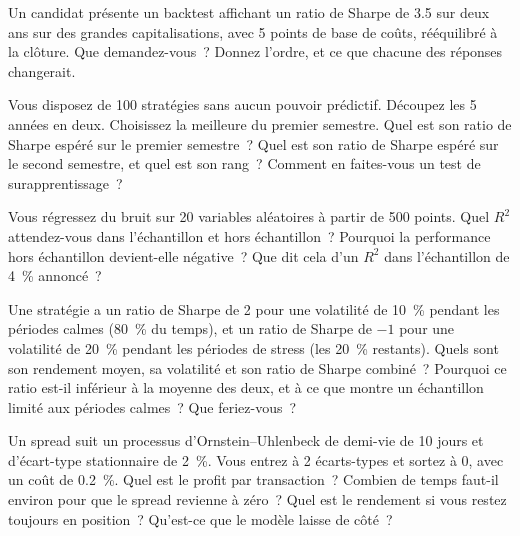 \begin{question}\label{iq:iv2:research-and-strategy-cases:26}
Un candidat présente un backtest affichant un ratio de Sharpe de 3.5 sur deux ans sur des grandes capitalisations, avec 5 points de base de coûts, rééquilibré à la clôture. Que demandez-vous~? Donnez l'ordre, et ce que chacune des réponses changerait.
\end{question}

\begin{question}\label{iq:iv2:research-and-strategy-cases:27}
Vous disposez de 100 stratégies sans aucun pouvoir prédictif. Découpez les 5 années en deux. Choisissez la meilleure du premier semestre. Quel est son ratio de Sharpe espéré sur le premier semestre~? Quel est son ratio de Sharpe espéré sur le second semestre, et quel est son rang~? Comment en faites-vous un test de surapprentissage~?
\end{question}

\begin{question}\label{iq:iv2:research-and-strategy-cases:28}
Vous régressez du bruit sur 20 variables aléatoires à partir de 500 points. Quel $R^2$ attendez-vous dans l'échantillon et hors échantillon~? Pourquoi la performance hors échantillon devient-elle négative~? Que dit cela d'un $R^2$ dans l'échantillon de 4~\% annoncé~?
\end{question}

\begin{question}\label{iq:iv2:research-and-strategy-cases:29}
Une stratégie a un ratio de Sharpe de 2 pour une volatilité de 10~\% pendant les périodes calmes (80~\% du temps), et un ratio de Sharpe de $-1$ pour une volatilité de 20~\% pendant les périodes de stress (les 20~\% restants). Quels sont son rendement moyen, sa volatilité et son ratio de Sharpe combiné~? Pourquoi ce ratio est-il inférieur à la moyenne des deux, et à ce que montre un échantillon limité aux périodes calmes~? Que feriez-vous~?
\end{question}

\begin{question}\label{iq:iv2:research-and-strategy-cases:30}
Un spread suit un processus d'Ornstein--Uhlenbeck de demi-vie de 10 jours et d'écart-type stationnaire de 2~\%. Vous entrez à 2 écarts-types et sortez à 0, avec un coût de 0.2~\%. Quel est le profit par transaction~? Combien de temps faut-il environ pour que le spread revienne à zéro~? Quel est le rendement si vous restez toujours en position~? Qu'est-ce que le modèle laisse de côté~?
\end{question}

